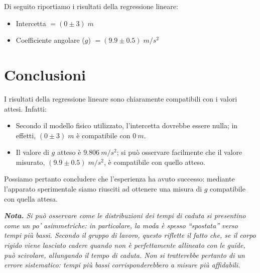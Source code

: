 \documentclass{article}
\begin{document}
Di seguito riportiamo i risultati della regressione lineare:
\begin{itemize}
    \item Intercetta $=(0\pm3)\;\unit{m}$
    \item Coefficiente angolare ($g$) $=(9.9\pm0.5)\;\unit{m \per s^2}$
\end{itemize}

\section{Conclusioni}
I risultati della regressione lineare sono chiaramente compatibili
con i valori attesi. Infatti:
\begin{itemize}
    \item Secondo il modello fisico utilizzato, l'intercetta dovrebbe essere nulla;
          in effetti, $(0\pm3)\;\unit{m}$ è compatibile con $\qty{0}{m}$.
    \item Il valore di $g$ atteso è $\qty{9.806}{m\per s^2}$; si può osservare
          facilmente che il valore misurato, $(9.9\pm0.5)\;\unit{m \per s^2}$, è
          compatibile con quello atteso.
\end{itemize}

Possiamo pertanto concludere che l'esperienza ha avuto successo: mediante l'apparato
sperimentale siamo riusciti ad ottenere una misura di $g$ compatibile con quella attesa.

\emph{\textbf{Nota.}
    Si può osservare come le distribuzioni dei tempi di caduta si
    presentino come un po' asimmetriche: in particolare, la moda è
    spesso “spostata” verso tempi più bassi. Secondo il gruppo di lavoro,
    questo riflette il fatto che, se il corpo rigido viene lasciato cadere
    quando non è perfettamente allineato con le guide, può scivolare,
    allungando il tempo di caduta. Non si tratterebbe pertanto di un errore
    sistematico: tempi più bassi corrisponderebbero a misure più affidabili.
}
\end{document}
